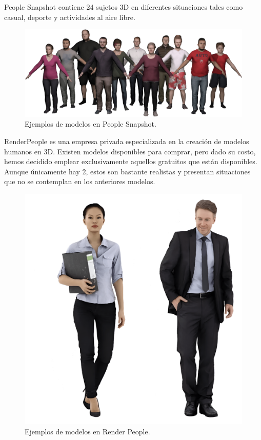 People Snapshot \cite{63} contiene 24 sujetos 3D en diferentes situaciones tales como casual, deporte y actividades al aire libre.

\begin{figure}[h]
	\centering
	\includegraphics[scale=0.5]{imagenes/cap4/snapshot.png}
	\caption[Ejemplos People Snapshot]{Ejemplos de modelos en People Snapshot.}
	\label{fig20}
\end{figure}

RenderPeople es una empresa privada especializada en la creación de modelos humanos en 3D. Existen modelos disponibles para comprar, pero dado su costo, hemos decidido emplear exclusivamente aquellos gratuitos que están disponibles. Aunque únicamente hay 2, estos son bastante realistas y presentan situaciones que no se contemplan en los anteriores modelos.

\begin{figure}[h]
	\centering
	\includegraphics[scale=0.04]{imagenes/cap4/renderpeople.png}
	\caption[Ejemplos Render People]{Ejemplos de modelos en Render People.}
	\label{fig21}
\end{figure}


